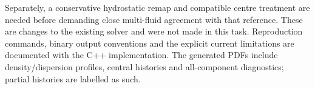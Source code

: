 \documentclass[11pt]{article}
\begin{document}
Separately, a conservative hydrostatic remap and compatible centre treatment
are needed before demanding close multi-fluid agreement with that reference.
These are changes to the existing solver and were not made in this task.
Reproduction commands, binary output conventions and the explicit current
limitations are documented with the C++ implementation. The generated PDFs
include density/dispersion profiles, central histories and all-component
diagnostics; partial histories are labelled as such.
\end{document}
